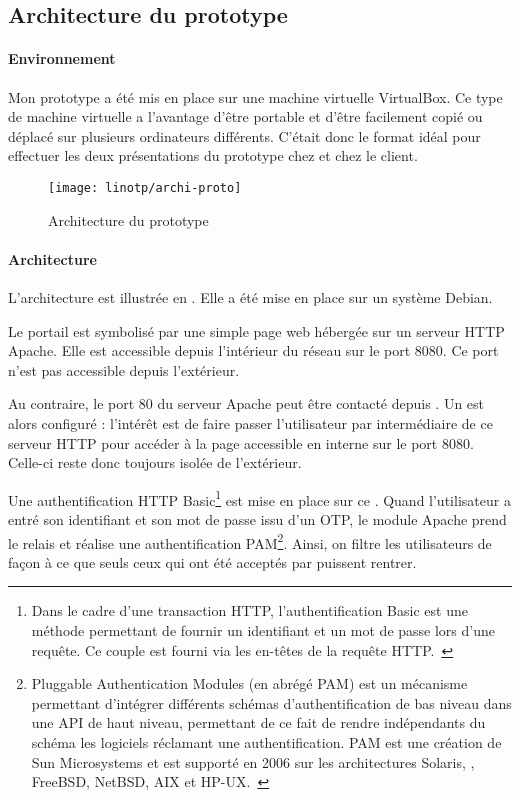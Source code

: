 \subsection{Architecture du prototype}
\label{section:linotp:prototype}

\paragraph{Environnement}
Mon prototype a été mis en place sur une machine virtuelle VirtualBox.
Ce type de machine virtuelle a l'avantage d'être portable et d'être facilement copié ou déplacé sur plusieurs ordinateurs différents.
C'était donc le format idéal pour effectuer les deux présentations du prototype chez \asmile{} et chez le client.

\begin{figure}
	\centering
	\texttt{[image: linotp/archi-proto]}
	\caption{Architecture du prototype \alinotp}
	\label{figure:linotp:archi-proto}
\end{figure}

\paragraph{Architecture}
L'architecture est illustrée en .
Elle a été mise en place sur un système \alinux{} Debian.

Le portail \aintranet{} \atypo{} est symbolisé par une simple page web hébergée sur un serveur HTTP Apache.
Elle est accessible depuis l'intérieur du réseau \aintranet{} sur le port 8080.
Ce port n'est pas accessible depuis l'extérieur.

Au contraire, le port 80 du serveur Apache peut être contacté depuis \ainternet.
Un \arp{} est alors configuré : l'intérêt est de faire passer l'utilisateur par intermédiaire de ce serveur HTTP pour accéder à la page accessible en interne sur le port 8080.
Celle-ci reste donc toujours isolée de l'extérieur.

Une authentification HTTP Basic\footnote{Dans le cadre d'une transaction HTTP, l'authentification Basic est une méthode permettant de fournir un identifiant et un mot de passe lors d'une requête. Ce couple est fourni via les en-têtes de la requête HTTP.~\cite{httpbasic}} est mise en place sur ce \arp{}.
Quand l'utilisateur a entré son identifiant et son mot de passe issu d'un OTP, le module Apache \amodpam{} prend le relais et réalise une authentification PAM\footnote{Pluggable Authentication Modules (en abrégé PAM) est un mécanisme permettant d'intégrer différents schémas d'authentification de bas niveau dans une API de haut niveau, permettant de ce fait de rendre indépendants du schéma les logiciels réclamant une authentification. PAM est une création de Sun Microsystems et est supporté en 2006 sur les architectures Solaris, \alinux, FreeBSD, NetBSD, AIX et HP-UX.~\cite{pam}}.
Ainsi, on filtre les utilisateurs de façon à ce que seuls ceux qui ont été acceptés par \alinotp{} puissent rentrer.

